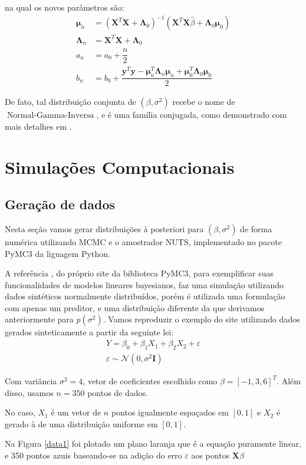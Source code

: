 \documentclass[12pt,letterpaper]{article}
\newcommand{\bd}[1]{\boldsymbol{#1}}
\newcommand{\op}{\operatorname}
\newcommand{\eps}{\varepsilon}
\newcommand{\norm}{\mathcal{N}}
\begin{document}
	na qual os novos parâmetros são:
	\begin{align}
		\bd\mu_n&=(\bd X^T\bd X+\bd\Lambda_0)^{-1}(\bd X^T\bd X\hat\beta+\bd\Lambda_ 0\bd\mu_0)\nonumber\\
		\bd\Lambda_n&=\bd X^T \bd X+\bd\Lambda_0\nonumber\\
		a_n&=a_0+\dfrac{n}{2}\label{posteriorformulas}\\
		b_n&=b_0+\dfrac{\bd y^T\bd y-\bd \mu_n^T\bd\Lambda_n\bd\mu_ n+\bd\mu_0^T\bd\Lambda_0\bd\mu_0}{2}\nonumber
	\end{align}
	
	De fato, tal distribuição conjunta de $(\beta,\sigma^2)$ recebe o nome de $\op{Normal-Gamma-Inversa}$, e é uma família conjugada, como demonstrado com mais detalhes em \cite{o1994kendall}.
	
	\section{Simulações Computacionais}
	
	\subsection{Geração de dados}
	Nesta seção vamos gerar distribuições à posteriori para $(\beta,\sigma^2)$ de forma numérica utilizando MCMC e o amostrador NUTS, implementado no pacote PyMC3 da liguagem Python.
	
	A referência \cite{pymc3_glm}, do próprio site da biblioteca PyMC3, para exemplificar suas funcionalidades de modelos lineares bayesianos, faz uma simulação utilizando dados sintéticos normalmente distribuídos, porém é utilizada uma formulação com apenas um preditor, e uma distribuição diferente da que derivamos anteriormente para $p(\sigma^2)$. Vamos reproduzir o exemplo do site utilizando dados gerados sinteticamente a partir da seguinte lei:
	\begin{align*}Y=\beta_0+\beta_1X_1+\beta_2X_2+\eps\\
		\eps\sim\norm\left(0,\sigma^2\bd I\right)\end{align*}
	
	Com variância $\sigma^2=4$, vetor de coeficientes escolhido como $\beta = [-1,3,6]^T$. Além disso, usamos $n=350$ pontos de dados.
	
	No caso, $X_1$ é um vetor de $n$ pontos igualmente espaçados em $[0,1]$ e $X_2$ é gerado à de uma distribuição uniforme em $[0,1]$.
	
	Na Figura \ref{data1} foi plotado um plano laranja que é a equação puramente linear, e 350 pontos azuis baseando-se na adição do erro $\eps$ aos pontos $\bd X\beta$
	
\end{document}
